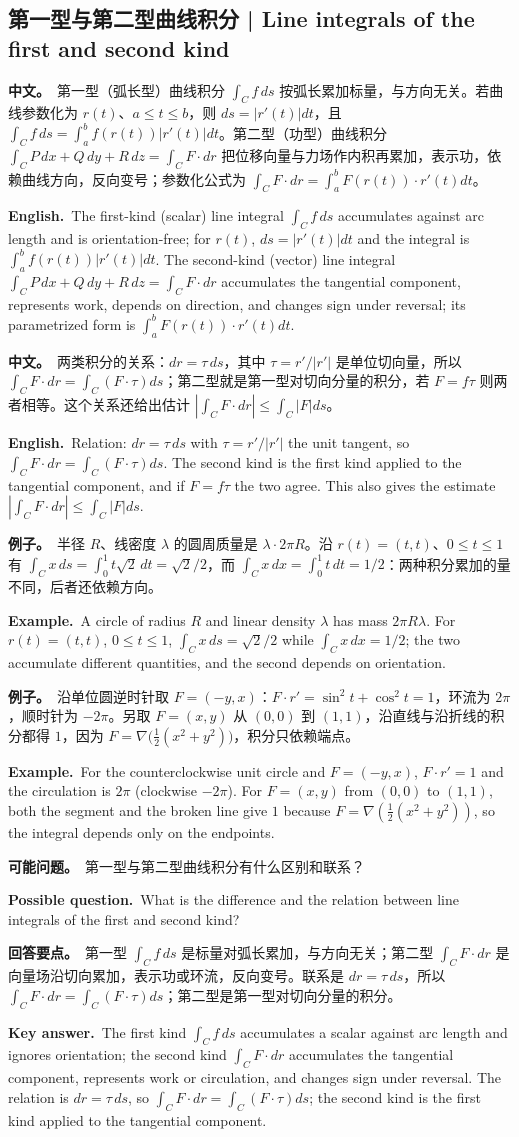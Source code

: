 \documentclass[UTF8,11pt,a4paper]{ctexart}
\newcommand{\BOTH}[2]{\par\noindent\textbf{中文。}\ #1\par\noindent\textbf{English.}\ #2\par}
\newcommand{\EX}[2]{\par\noindent\textbf{例子。}\ #1\par\noindent\textbf{Example.}\ #2\par}
\newcommand{\ASK}[4]{\begin{samepage}\par\noindent\textbf{可能问题。}\ #1\par\noindent\textbf{Possible question.}\ #2\par\noindent\textbf{回答要点。}\ #3\par\noindent\textbf{Key answer.}\ #4\medskip\end{samepage}}
\begin{document}
\subsection{第一型与第二型曲线积分 | Line integrals of the first and second kind}
\BOTH{第一型（弧长型）曲线积分 $\int_Cf\,ds$ 按弧长累加标量，与方向无关。若曲线参数化为 $r(t)$、$a\le t\le b$，则 $ds=|r'(t)|dt$，且 $\int_Cf\,ds=\int_a^bf(r(t))|r'(t)|dt$。第二型（功型）曲线积分 $\int_CP\,dx+Q\,dy+R\,dz=\int_CF\cdot dr$ 把位移向量与力场作内积再累加，表示功，依赖曲线方向，反向变号；参数化公式为 $\int_CF\cdot dr=\int_a^bF(r(t))\cdot r'(t)dt$。}{The first-kind (scalar) line integral $\int_Cf\,ds$ accumulates against arc length and is orientation-free; for $r(t)$, $ds=|r'(t)|dt$ and the integral is $\int_a^bf(r(t))|r'(t)|dt$. The second-kind (vector) line integral $\int_CP\,dx+Q\,dy+R\,dz=\int_CF\cdot dr$ accumulates the tangential component, represents work, depends on direction, and changes sign under reversal; its parametrized form is $\int_a^bF(r(t))\cdot r'(t)dt$.}
\BOTH{两类积分的关系：$dr=\tau\,ds$，其中 $\tau=r'/|r'|$ 是单位切向量，所以 $\int_CF\cdot dr=\int_C(F\cdot\tau)ds$；第二型就是第一型对切向分量的积分，若 $F=f\tau$ 则两者相等。这个关系还给出估计 $|\int_CF\cdot dr|\le\int_C|F|ds$。}{Relation: $dr=\tau\,ds$ with $\tau=r'/|r'|$ the unit tangent, so $\int_CF\cdot dr=\int_C(F\cdot\tau)ds$. The second kind is the first kind applied to the tangential component, and if $F=f\tau$ the two agree. This also gives the estimate $|\int_CF\cdot dr|\le\int_C|F|ds$.}
\EX{半径 $R$、线密度 $\lambda$ 的圆周质量是 $\lambda\cdot2\pi R$。沿 $r(t)=(t,t)$、$0\le t\le1$ 有 $\int_Cx\,ds=\int_0^1t\sqrt2\,dt=\sqrt2/2$，而 $\int_Cx\,dx=\int_0^1t\,dt=1/2$：两种积分累加的量不同，后者还依赖方向。}{A circle of radius $R$ and linear density $\lambda$ has mass $2\pi R\lambda$. For $r(t)=(t,t)$, $0\le t\le1$, $\int_Cx\,ds=\sqrt2/2$ while $\int_Cx\,dx=1/2$; the two accumulate different quantities, and the second depends on orientation.}
\EX{沿单位圆逆时针取 $F=(-y,x)$：$F\cdot r'=\sin^2t+\cos^2t=1$，环流为 $2\pi$，顺时针为 $-2\pi$。另取 $F=(x,y)$ 从 $(0,0)$ 到 $(1,1)$，沿直线与沿折线的积分都得 $1$，因为 $F=\nabla\bigl(\frac12(x^2+y^2)\bigr)$，积分只依赖端点。}{For the counterclockwise unit circle and $F=(-y,x)$, $F\cdot r'=1$ and the circulation is $2\pi$ (clockwise $-2\pi$). For $F=(x,y)$ from $(0,0)$ to $(1,1)$, both the segment and the broken line give $1$ because $F=\nabla(\frac12(x^2+y^2))$, so the integral depends only on the endpoints.}
\ASK{第一型与第二型曲线积分有什么区别和联系？}{What is the difference and the relation between line integrals of the first and second kind?}{第一型 $\int_Cf\,ds$ 是标量对弧长累加，与方向无关；第二型 $\int_CF\cdot dr$ 是向量场沿切向累加，表示功或环流，反向变号。联系是 $dr=\tau\,ds$，所以 $\int_CF\cdot dr=\int_C(F\cdot\tau)ds$；第二型是第一型对切向分量的积分。}{The first kind $\int_Cf\,ds$ accumulates a scalar against arc length and ignores orientation; the second kind $\int_CF\cdot dr$ accumulates the tangential component, represents work or circulation, and changes sign under reversal. The relation is $dr=\tau\,ds$, so $\int_CF\cdot dr=\int_C(F\cdot\tau)ds$; the second kind is the first kind applied to the tangential component.}
\end{document}
